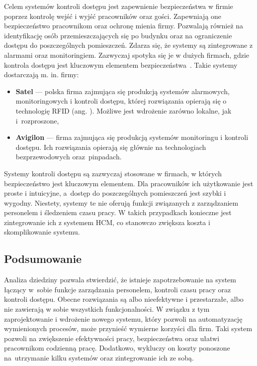 Celem systemów kontroli dostępu jest zapewnienie bezpieczeństwa w firmie poprzez kontrolę wejść i wyjść pracowników oraz gości. Zapewniają one bezpieczeństwo pracownikom oraz ochronę mienia firmy. Pozwalają również na identyfikację osób przemieszczających się po budynku oraz na ograniczenie dostępu do poszczególnych pomieszczeń. Zdarza się, że systemy są zintegrowane z alarmami oraz monitoringiem. Zazwyczaj spotyka się je w dużych firmach, gdzie kontrola dostępu jest kluczowym elementem bezpieczeństwa~\cite{bib:KontrolaDostepu}. Takie systemy dostarczają m. in. firmy:

\begin{itemize}
    \item \textbf{Satel} \cite{bib:satel} --- polska firma zajmująca się produkcją systemów alarmowych, monitoringowych i kontroli dostępu, której rozwiązania opierają się o technologię RFID (ang. ). Możliwe jest wdrożenie zarówno lokalne, jak i~rozproszone,
    \item \textbf{Avigilon} \cite{bib:avigilon} --- firma zajmująca się produkcją systemów monitoringu i kontroli dostępu. Ich rozwiązania opierają się głównie na technologiach bezprzewodowych oraz~pinpadach.
\end{itemize}

Systemy kontroli dostępu są zazwyczaj stosowane w firmach, w których bezpieczeństwo jest kluczowym elementem. Dla pracowników ich użytkowanie jest proste i intuicyjne, a~dostęp do poszczególnych pomieszczeń jest szybki i wygodny. Niestety, systemy te nie oferują funkcji związanych z zarządzaniem personelem i śledzeniem czasu pracy. W takich przypadkach konieczne jest zintegrowanie ich z systemem HCM, co stanowczo zwiększa koszta i skomplikowanie systemu.

\subsection{Podsumowanie}

Analiza dziedziny pozwala stwierdzić, że istnieje zapotrzebowanie na system łączący w~sobie funkcje zarządzania personelem, kontroli czasu pracy oraz kontroli dostępu. Obecne rozwiązania są albo nieefektywne i przestarzałe, albo nie zawierają w sobie wszystkich funkcjonalności. W związku z tym zaprojektowanie i wdrożenie nowego systemu, który pozwoli na automatyzację wymienionych procesów, może przynieść wymierne korzyści dla firm. Taki system pozwoli na zwiększenie efektywności pracy, bezpieczeństwa oraz ułatwi pracownikom codzienną pracę. Dodatkowo, wykluczy on koszty ponoszone na~utrzymanie kilku systemów oraz zintegrowanie ich ze sobą.

